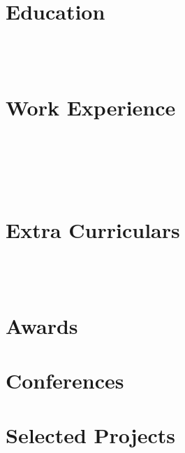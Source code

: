 \documentclass[a4paper,11pt]{article}
\begin{document}
\pagestyle{empty}

 \\[2pt]
 \\[-20pt]


\section{Education}
 \\[8pt]
 \\[-18pt]


\section{Work Experience}
 \\[8pt]
 \\[8pt]
 \\[8pt]
 \\[-14pt]

\section{Extra Curriculars}
 \\[8pt]
 \\[-18pt]

\newpage

\section{Awards}


\section{Conferences}


\section{Selected Projects}
 \\[8pt]
 \\[8pt]
 \\[8pt]
 
\end{document}
